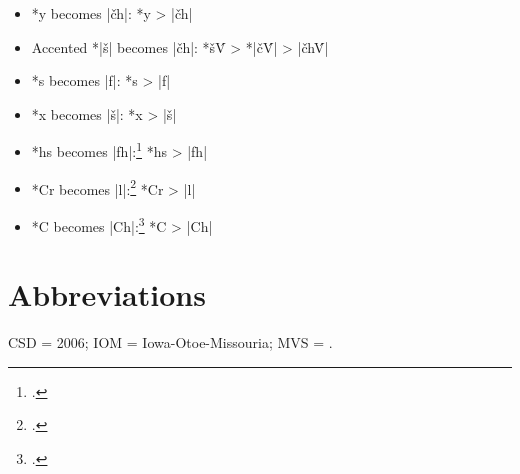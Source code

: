 \documentclass[output=paper]{LSP/langsci}
\begin{document}
\begin{itemize}
\item *y becomes |\v{c}h|: \hspace{5em} *y	>	|\v{c}h|
\item Accented *|š| becomes |\v{c}h|: \hspace{1em} *š\'V	>	*|\v{c}\'V|	>	|\v{c}h\'V|
\item *s becomes |f|: \hspace{6em} *s	>	|f|
\item *x becomes |š|: \hspace{6em} 	*x	>	|š|
\item *hs becomes |fh|:\footnote{\citealt[174, 299]{Rankinetal2006PDF}.}  \hspace{4.8em} 			*hs	>	|fh|
\item *Cr becomes |l|:\footnote{\citealt[90]{Rankinetal2006PDF}.}  \hspace{5em} 			*Cr	>	|l|
\item *C\textsuperscript{} becomes |Ch|:\footnote{\citealt[229, 232]{Rankinetal2006PDF}.}  \hspace{3.9em} *C\textsuperscript{}	>	|Ch|
\end{itemize}

\section*{Abbreviations}

CSD =  2006; IOM = Iowa-Otoe-Missouria; MVS = .

 

\printbibliography[heading=subbibliography,notkeyword=this]
 
\end{document}
